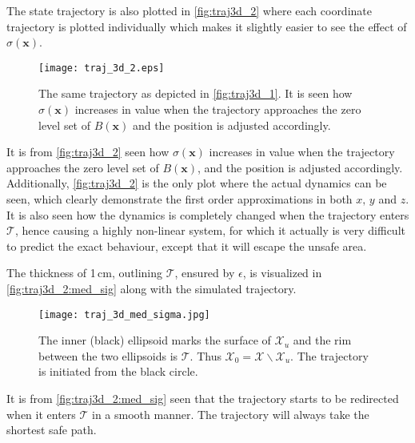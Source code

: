 The state trajectory is also plotted in \autoref{fig:traj3d_2} where each coordinate trajectory is plotted individually which makes it slightly easier to see the effect of $\sigma(\textbf{x})$. 
\begin{figure}[H]
\centering
	\texttt{[image: traj\_3d\_2.eps]}
	\caption{The same trajectory as depicted in \autoref{fig:traj3d_1}. It is seen how  $\sigma(\textbf{x})$ increases in value when the trajectory approaches the zero level set of $B(\textbf{x})$ and the position is adjusted accordingly.}
	\label{fig:traj3d_2}
\end{figure}
It is from \autoref{fig:traj3d_2} seen how $\sigma(\textbf{x})$ increases in value when the trajectory approaches the zero level set of $B(\textbf{x})$, and the position is adjusted accordingly. Additionally,  \autoref{fig:traj3d_2} is the only plot where the actual dynamics can be seen, which clearly demonstrate the first order approximations in both $x,\,y$ and $z$. It is also seen how the dynamics is completely changed when the trajectory enters $\mathcal{T}$, hence causing a highly non-linear system, for which it actually is very difficult to predict the exact behaviour, except that it will escape the unsafe area.

The thickness of 1\,cm, outlining $\mathcal{T}$, ensured by $\epsilon$, is visualized in \autoref{fig:traj3d_2:med_sig} along with the simulated trajectory.
\begin{figure}[H]
\centering
	\texttt{[image: traj\_3d\_med\_sigma.jpg]}
	\caption{The inner (black) ellipsoid marks the surface of $\mathcal{X}_u$ and the rim between the two ellipsoids is $\mathcal{T}$. Thus $\mathcal{X}_0 = \mathcal{X} \backslash \mathcal{X}_u$. The trajectory is initiated from the black circle.}
	\label{fig:traj3d_2:med_sig}
\end{figure}
It is from \autoref{fig:traj3d_2:med_sig} seen that the trajectory starts to be redirected when it enters $\mathcal{T}$ in a smooth manner. The trajectory will always take the shortest safe path.




